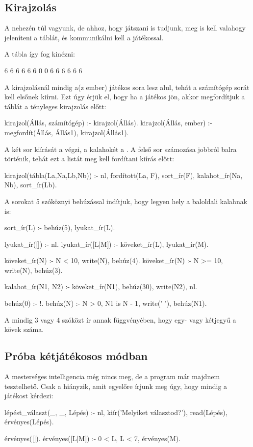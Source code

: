 \subsection*{Kirajzolás}
A nehezén túl vagyunk, de ahhoz, hogy játszani is
tudjunk, meg is kell valahogy jeleníteni a táblát,
és kommunikálni kell a játékossal.

A tábla így fog kinézni:
\begin{query}
     6    6    6    6    6    6
0                                  0
     6    6    6    6    6    6
\end{query}

A kirajzolásnál mindig a(z ember) játékos sora lesz
alul, tehát a számítógép sorát kell elsőnek
kiírni. Ezt úgy érjük el, hogy ha a játékos jön,
akkor megfordítjuk a táblát a tényleges kirajzolás
előtt:
\begin{program}
kirajzol(Állás, számítógép) :- kirajzol(Állás).
kirajzol(Állás, ember) :-
    megfordít(Állás, Állás1),
    kirajzol(Állás1).
\end{program}

A két sor kiírását a  végzi, a
kalahokét a . A felső sor számozása
jobbról balra történik, tehát ezt a listát meg kell
fordítani kiírás előtt:
\begin{program}
kirajzol(tábla(La,Na,Lb,Nb)) :-
    nl,
    fordított(La, F),
    sort_ír(F),
    kalahot_ír(Na, Nb),
    sort_ír(Lb).
\end{program}

A sorokat 5 szóköznyi behúzással indítjuk, hogy
legyen hely a baloldali kalahnak is:
\begin{program}
sort_ír(L) :- behúz(5), lyukat_ír(L).

lyukat_ír([]) :- nl.
lyukat_ír([L|M]) :- köveket_ír(L), lyukat_ír(M).

köveket_ír(N) :- N < 10, write(N), behúz(4).
köveket_ír(N) :- N >= 10, write(N), behúz(3).

kalahot_ír(N1, N2) :-
    köveket_ír(N1), behúz(30),
    write(N2), nl.

behúz(0) :- !.
behúz(N) :-
    N > 0, N1 is N - 1,
    write(' '), behúz(N1).
\end{program}

A  mindig 3 vagy 4 szóközt ír annak
függvényében, hogy egy- vagy kétjegyű a kövek száma.

\subsection*{Próba kétjátékosos módban}
A mesterséges intelligencia még nincs meg, de a
program már majdnem tesztelhető. Csak a
 hiányzik, amit egyelőre írjunk
meg úgy, hogy mindig a játékost kérdezi:
\begin{program}
lépést_választ(_, _, Lépés) :-
    nl, kiír('Melyiket választod?'),
    read(Lépés), érvényes(Lépés).

érvényes([]).
érvényes([L|M]) :- 0 < L, L < 7, érvényes(M).
\end{program}

